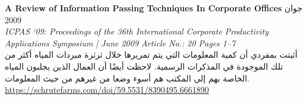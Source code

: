 \foreignlanguage{english}{\textbf{A Review of Information Passing Techniques In Corporate Offices}} \hfill جوان 2009\\
\foreignlanguage{english}{\textit{ICPAS ‘09: Proceedings of the 36th International Corporate Productivity Applications Symposium | June 2009 Article No.: 20 Pages 1–7}}\\
أثبتت بمفردي أن كمية المعلومات التي يتم تمريرها خلال ثرثرة مبردات المياه أكثر من تلك الموجودة في المذكرات الرسمية. لاحظت أيضًا أن العمال الذين يجلبون المياه الخاصة بهم إلى المكتب هم أسوء وضعا من غيرهم من حيث المعلومات.\\
\foreignlanguage{english}{\href{https://schrutefarms.com/doi/59.5531/8390495.6661890}{https://schrutefarms.com/doi/59.5531/8390495.6661890}}
\vspace*{2mm}